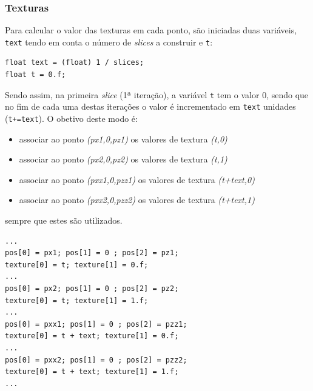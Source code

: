\documentclass{article}
\begin{document}
\subsubsection{Texturas}
Para calcular o valor das texturas em cada ponto, são iniciadas duas variáveis, \texttt{text} tendo em conta o número de \textit{slices} a construir e \texttt{t}:

\begin{verbatim}
float text = (float) 1 / slices;
float t = 0.f;
\end{verbatim}

Sendo assim, na primeira \textit{slice} (1ª iteração), a variável \texttt{t} tem o valor 0, sendo que no fim de cada uma destas iterações o valor é incrementado em \texttt{text} unidades (\texttt{t+=text}).
O obetivo deste modo é:
\begin{itemize}
	\item associar ao ponto \textit{(px1,0,pz1)} os valores de textura \textit{(t,0)}
	\item associar ao ponto \textit{(px2,0,pz2)} os valores de textura \textit{(t,1)}
	\item associar ao ponto \textit{(pxx1,0,pzz1)} os valores de textura \textit{(t+text,0)}
	\item associar ao ponto \textit{(pxx2,0,pzz2)} os valores de textura \textit{(t+text,1)}
\end{itemize}
sempre que estes são utilizados.

\begin{verbatim}
...
pos[0] = px1; pos[1] = 0 ; pos[2] = pz1;
texture[0] = t; texture[1] = 0.f;
...
pos[0] = px2; pos[1] = 0 ; pos[2] = pz2;
texture[0] = t; texture[1] = 1.f;        
...
pos[0] = pxx1; pos[1] = 0 ; pos[2] = pzz1;
texture[0] = t + text; texture[1] = 0.f;
...
pos[0] = pxx2; pos[1] = 0 ; pos[2] = pzz2;
texture[0] = t + text; texture[1] = 1.f;
...
\end{verbatim}

\newpage
\end{document}
